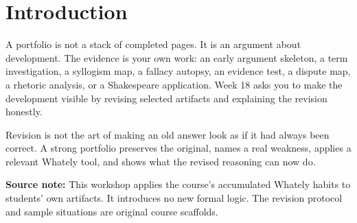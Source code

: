 \documentclass[12pt]{article}
\newcommand{\focusbox}[1]{\par\vspace{0.4em}\noindent\begingroup\setlength{\fboxsep}{6pt}\colorbox{gray!12}{\begin{minipage}{\dimexpr\linewidth-2\fboxsep\relax}#1\end{minipage}}\endgroup\par\vspace{0.5em}}
\begin{document}
\section*{Introduction}
A portfolio is not a stack of completed pages. It is an argument about development. The evidence is your own work: an early argument skeleton, a term investigation, a syllogism map, a fallacy autopsy, an evidence test, a dispute map, a rhetoric analysis, or a Shakespeare application. Week 18 asks you to make the development visible by revising selected artifacts and explaining the revision honestly.

Revision is not the art of making an old answer look as if it had always been correct. A strong portfolio preserves the original, names a real weakness, applies a relevant Whately tool, and shows what the revised reasoning can now do.

\focusbox{\textbf{Source note:} This workshop applies the course's accumulated Whately habits to students' own artifacts. It introduces no new formal logic. The revision protocol and sample situations are original course scaffolds.}
\end{document}
